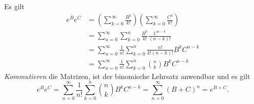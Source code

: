 \documentclass[a4paper]{article}
\begin{document}
\subsection{}
Es gilt
\begin{align*}
e^B e^C &= \left( \sum_{k=0}^∞ \frac{B^k}{k!} \right)\left( \sum_{k=0}^∞ \frac{C^k}{k!} \right)\\
&= \sum_{n=0}^∞ \sum_{k=0}^n \frac{B^k}{k!} \frac{C^{n-k}}{(n-k)!}\\
&= \sum_{n=0}^∞\frac{1}{n!} \sum_{k=0}^n \frac{n!}{k!(n-k)!} B^kC^{n-k}\\
&= \sum_{n=0}^∞\frac{1}{n!} \sum_{k=0}^n \binom{n}{k} B^k C^{n-k} 
\end{align*}
\emph{Kommutieren} die Matrizen, ist der binomische Lehrsatz anwendbar und es gilt
$$e^B e^C = \sum_{n=0}^∞ \frac{1}{n!}\sum_{k=0}^n \binom{n}{k} B^k C^{n-k} = \sum_{n=0}^∞ (B+C)^n = e^{B+C}.$$
\setcounter{section}{2}
\section{}
\end{document}
